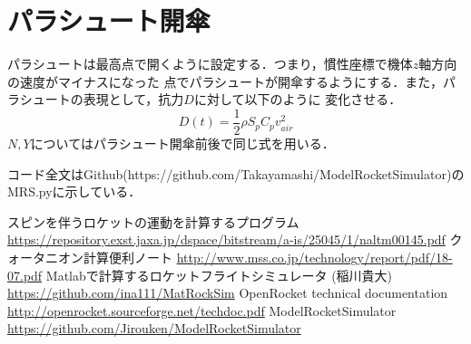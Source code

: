 \documentclass[a4paper]{jsarticle}
\begin{document}
\section{パラシュート開傘}
パラシュートは最高点で開くように設定する．つまり，慣性座標で機体$z$軸方向の速度がマイナスになった
点でパラシュートが開傘するようにする．また，パラシュートの表現として，抗力$D$に対して以下のように
変化させる．
\begin{equation}
  D(t) = \frac{1}{2} \rho S_p C_p v_{air}^2
\end{equation}
$N, Y$についてはパラシュート開傘前後で同じ式を用いる．


コード全文はGithub(https://github.com/Takayamashi/ModelRocketSimulator)のMRS.pyに示している．

\begin{thebibliography}{99}
   スピンを伴うロケットの運動を計算するプログラム
  \url{https://repository.exst.jaxa.jp/dspace/bitstream/a-is/25045/1/naltm00145.pdf}
   クォータニオン計算便利ノート
  \url{http://www.mss.co.jp/technology/report/pdf/18-07.pdf}
   Matlabで計算するロケットフライトシミュレータ (稲川貴大)
  \url{https://github.com/ina111/MatRockSim}
   OpenRocket technical documentation
  \url{http://openrocket.sourceforge.net/techdoc.pdf}
   ModelRocketSimulator
  \url{https://github.com/Jirouken/ModelRocketSimulator}
\end{thebibliography}
\end{document}
